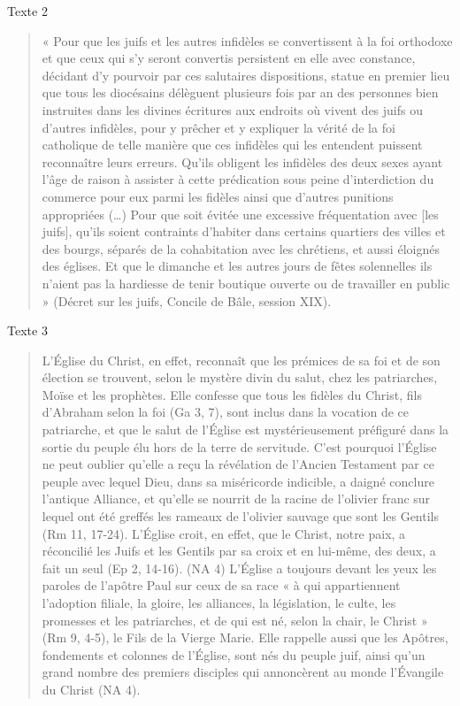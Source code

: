 Texte  2 
\begin{quote}
    «  Pour  que  les  juifs  et  les  autres  infidèles  se  convertissent  à  la  foi  orthodoxe  et  que  ceux  qui s’y  seront  convertis  persistent  en  elle  avec  constance,  décidant  d’y  pourvoir  par  ces  salutaires dispositions,  statue  en  premier  lieu  que  tous  les  diocésains  délèguent  plusieurs  fois  par  an  des personnes  bien  instruites  dans  les  divines  écritures  aux  endroits  où  vivent  des  juifs  ou  d’autres infidèles,  pour  y  prêcher  et  y  expliquer  la  vérité  de  la  foi  catholique  de  telle  manière  que  ces infidèles  qui  les  entendent  puissent  reconnaître  leurs  erreurs.  Qu’ils  obligent  les  infidèles  des deux  sexes  ayant  l’âge  de  raison  à  assister  à  cette  prédication  sous  peine  d’interdiction  du commerce  pour  eux  parmi  les  fidèles  ainsi  que  d’autres  punitions  appropriées  (…)  Pour  que soit  évitée  une  excessive  fréquentation  avec  [les  juifs],  qu’ils  soient  contraints  d’habiter  dans certains  quartiers  des  villes  et  des  bourgs,  séparés  de  la  cohabitation  avec  les  chrétiens,  et aussi  éloignés  des  églises.  Et  que  le  dimanche  et  les  autres  jours  de  fêtes  solennelles  ils n’aient  pas  la  hardiesse  de  tenir  boutique  ouverte  ou  de  travailler  en  public  »  (Décret  sur  les juifs, Concile  de  Bâle, session XIX). 
\end{quote}

Texte  3 
\begin{quote}
    L’Église  du  Christ,  en  effet,  reconnaît  que  les  prémices  de  sa  foi  et  de  son  élection  se trouvent,  selon  le  mystère  divin  du  salut,  chez  les  patriarches,  Moïse  et  les  prophètes.  Elle confesse  que  tous  les  fidèles  du  Christ,  fils  d’Abraham  selon  la  foi  (Ga  3,  7),  sont  inclus  dans la  vocation  de  ce  patriarche,  et  que  le  salut  de  l’Église  est  mystérieusement  préfiguré  dans  la sortie  du  peuple  élu  hors  de  la  terre  de  servitude.  C’est  pourquoi  l’Église  ne  peut  oublier qu’elle  a  reçu  la  révélation  de  l’Ancien  Testament  par  ce  peuple  avec  lequel  Dieu,  dans  sa miséricorde  indicible,  a  daigné  conclure  l’antique  Alliance,  et  qu’elle  se  nourrit  de  la  racine de  l’olivier  franc  sur  lequel  ont  été  greffés  les  rameaux  de  l’olivier  sauvage  que  sont  les Gentils  (Rm  11,  17-24).  L’Église  croit,  en  effet,  que  le  Christ,  notre  paix,  a  réconcilié  les  Juifs et  les  Gentils  par sa  croix et  en lui-même, des  deux, a  fait  un seul  (Ep  2, 14-16). (NA  4) L’Église  a  toujours  devant  les  yeux  les  paroles  de  l’apôtre  Paul  sur  ceux  de  sa  race  «  à  qui appartiennent  l’adoption  filiale,  la  gloire,  les  alliances,  la  législation,  le  culte,  les  promesses  et les  patriarches,  et  de  qui  est  né,  selon  la  chair,  le  Christ  »  (Rm  9,  4-5),  le  Fils  de  la  Vierge Marie.  Elle  rappelle  aussi  que  les  Apôtres,  fondements  et  colonnes  de  l’Église,  sont  nés  du peuple  juif,  ainsi  qu’un  grand  nombre  des  premiers  disciples  qui  annoncèrent  au  monde l’Évangile  du Christ  (NA  4). 

\end{quote}

